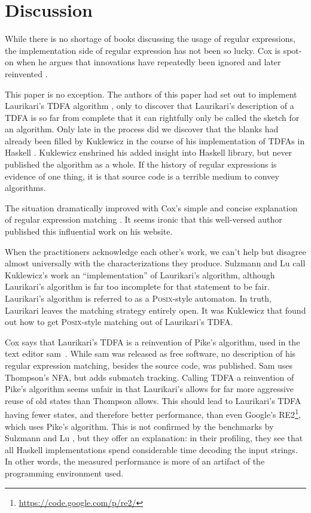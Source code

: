 \documentclass[11pt]{Thesis}
\theoremstyle{definition}
\newcommand{\seclabel}[1]{\label{sec:#1}}
\begin{document}
\section{Discussion}\seclabel{discuss-related}
While there is no shortage of books discussing the usage of regular
expressions, the implementation side of regular expression has not
been so lucky. Cox is spot-on when he argues that innovations have
repeatedly been ignored and later reinvented \cite{Cox07a,Cox09a,Cox10a}. 

This paper is no exception. The authors of this paper had set out to implement
Laurikari's TDFA algorithm \cite{Laur00a}, only to discover that Laurikari's
description of a TDFA is so far from complete that it can rightfully only be
called the sketch for an algorithm. Only late in the process did we discover
that the blanks had already been filled by Kuklewicz in the course of his
implementation of TDFAs in Haskell \cite{Kukl07a}. Kuklewicz enshrined his
added insight into Haskell library, but never published the algorithm as a
whole. If the history of regular expressions is evidence of one thing, it is
that source code is a terrible medium to convey algorithms. 

The situation dramatically improved with Cox's simple and concise
explanation of regular expression matching \cite{Cox07a}. It seems
ironic that this well-versed author published this influential work
on his website.

When the practitioners acknowledge each other's work, we can't
help but disagree almost universally with the characterizations they
produce. Sulzmann and Lu \cite{Sulz12a} call Kuklewicz's
work an ``implementation'' of Laurikari's algorithm, although Laurikari's
algorithm is far too incomplete for that statement to be fair. Laurikari's
algorithm is referred to as a \textsc{Posix}-style automaton. In truth, Laurikari
leaves the matching strategy entirely open. It was Kuklewicz that
found out how to get \textsc{Posix}-style matching out of Laurikari's TDFA. 

Cox says that Laurikari's TDFA is a reinvention of Pike's algorithm,
used in the text editor sam~\cite{Pike87a}.  While sam was released
as free software, no description of his regular expression matching,
besides the source code, was published.  Sam uses Thompson's NFA,
but adds submatch tracking. Calling TDFA a reinvention of Pike's algorithm
seems unfair in that Laurikari's allows for far more aggressive reuse of old
states than Thompson allows. This should lead to Laurikari's TDFA having fewer
states, and therefore better performance, than even Google's
RE2\footnote{\url{https://code.google.com/p/re2/}}, which uses Pike's
algorithm. This is not confirmed by the benchmarks by Sulzmann and Lu
\cite{Sulz12a}, but they offer an explanation: in their profiling, they see
that all Haskell implementations spend considerable time decoding the input
strings. In other words, the measured performance is more of an artifact of the
programming environment used.
\end{document}
